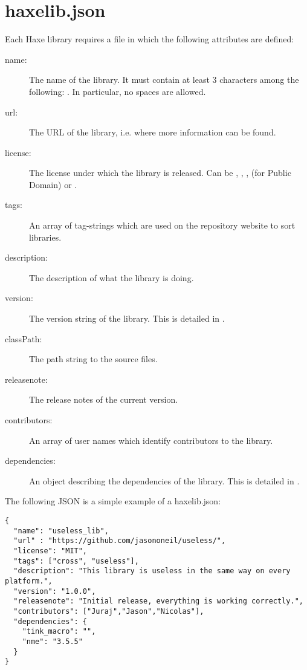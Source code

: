 \section{haxelib.json}
\label{haxelib-json}

Each Haxe library requires a  file in which the following attributes are defined:

\begin{description}
	\item[name:] The name of the library. It must contain at least 3 characters among the following: \ic{\[A-Za-z0-9_-.\]}. In particular, no spaces are allowed.
	\item[url:] The URL of the library, i.e. where more information can be found.
	\item[license:] The license under which the library is released. Can be , , ,  (for Public Domain) or .
	\item[tags:] An array of tag-strings which are used on the repository website to sort libraries.
	\item[description:] The description of what the library is doing.
	\item[version:] The version string of the library. This is detailed in .
	\item[classPath:] The path string to the source files.
	\item[releasenote:] The release notes of the current version.
	\item[contributors:] An array of user names which identify contributors to the library. 
	\item[dependencies:] An object describing the dependencies of the library. This is detailed in .
\end{description}

The following JSON is a simple example of a haxelib.json:

\begin{lstlisting}
{
  "name": "useless_lib",
  "url" : "https://github.com/jasononeil/useless/",
  "license": "MIT",
  "tags": ["cross", "useless"],
  "description": "This library is useless in the same way on every platform.",
  "version": "1.0.0",
  "releasenote": "Initial release, everything is working correctly.",
  "contributors": ["Juraj","Jason","Nicolas"],
  "dependencies": {
    "tink_macro": "",
    "nme": "3.5.5"
  }
}
\end{lstlisting}


